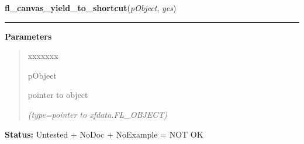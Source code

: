     \label{xformslib:library:fl_canvas_yield_to_shortcut}

    \vspace{0.5ex}

\hspace{.8\funcindent}\begin{boxedminipage}{\funcwidth}

    \raggedright \textbf{fl\_canvas\_yield\_to\_shortcut}(\textit{pObject}, \textit{yes})

    \vspace{-1.5ex}

    \rule{\textwidth}{0.5\fboxrule}
\setlength{\parskip}{2ex}
\setlength{\parskip}{1ex}
      \textbf{Parameters}
      \vspace{-1ex}

      \begin{quote}
        \begin{Ventry}{xxxxxxx}

          \item[pObject]

          pointer to object

            {\it (type=pointer to xfdata.FL\_OBJECT)}

        \end{Ventry}

      \end{quote}

\textbf{Status:} Untested + NoDoc + NoExample = NOT OK



    \end{boxedminipage}

    \label{xformslib:library:fl_add_glcanvas}

    \vspace{0.5ex}


